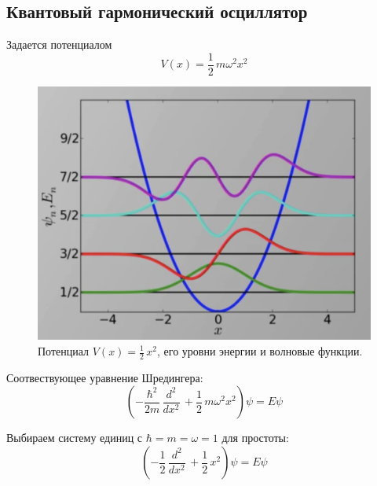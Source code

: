 \setcounter{chapter}{4}
\begin{lecture}
\section{Квантовый гармонический осциллятор}
Задается потенциалом
\begin{equation}
    \label{eq:harmonic_potential_def}
    V(x) = \frac{1}{2}\, m \omega^2 x^2
\end{equation}

\begin{figure}
    \label{fig:harmonic_levels}
    \centering
    \includegraphics[width=\linewidth]{fig/harmonic_levels}
    \caption{Потенциал $V(x) = \frac{1}{2}\, x^2$, его уровни энергии и волновые функции.} 
\end{figure}

Соотвествующее уравнение Шредингера:
\begin{equation}
    \label{eq:schrodinger_equation_harmonic}
    \left( -\frac{\hbar^2}{2m}\, \frac{d^2}{dx^2}\, + \frac{1}{2}\, m \omega^2 x^2 \right) \psi = E \psi
\end{equation}

Выбираем систему единиц с $\hbar = m = \omega = 1$ для простоты:
\begin{equation}
    \label{eq:schrodinger_equation_harmonic_atomic_units}
    \left( -\frac{1}{2}\, \frac{d^2}{dx^2}\, + \frac{1}{2}\, x^2 \right) \psi = E \psi
\end{equation}


\end{lecture}
